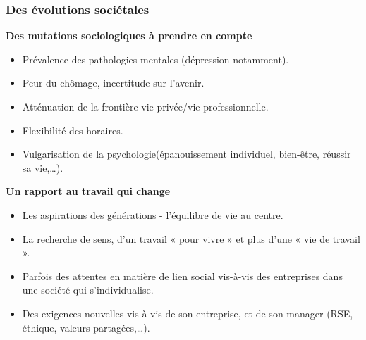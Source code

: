 \documentclass{beamer}
\begin{document}
\begin{frame}
\frametitle{Des évolutions sociétales}

\textbf{Des mutations sociologiques à prendre en compte}  
\begin{itemize}
\item Prévalence des pathologies mentales (dépression notamment).

\item Peur du chômage, incertitude sur l’avenir.

\item Atténuation de la frontière vie privée/vie professionnelle.

\item Flexibilité des horaires.

\item Vulgarisation de la psychologie(épanouissement individuel, bien-être, réussir sa vie,…).
\end{itemize}

\textbf{Un rapport au travail qui change}
\begin{itemize}
\item Les aspirations des générations - l’équilibre de vie au centre.

\item La recherche de sens, d’un travail « pour vivre » et plus d’une « vie de travail ».

\item Parfois des attentes en matière de lien social vis-à-vis des entreprises dans une société qui 
s’individualise.

\item Des exigences nouvelles vis-à-vis de son entreprise, et de son manager (RSE, éthique, valeurs 
partagées,…).
\end{itemize}
\end{frame} 
\end{document}
